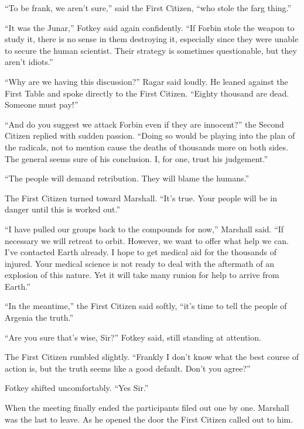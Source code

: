 ``To be frank, we aren't sure,'' said the First Citizen, ``who stole the farg thing.''

``It was the Junar,'' Fotkey said again confidently. ``If Forbin stole the weapon to study it,
there is no sense in them destroying it, especially since they were unable to secure the human
scientist. Their strategy is sometimes questionable, but they aren't idiots.''


``Why are we having this discussion?'' Ragar said loudly. He leaned against the First Table and
spoke directly to the First Citizen. ``Eighty thousand are dead. Someone must pay!''

``And do you suggest we attack Forbin even if they are innocent?'' the Second Citizen replied
with sudden passion. ``Doing so would be playing into the plan of the radicals, not to mention
cause the deaths of thousands more on both sides. The general seems sure of his conclusion. I,
for one, trust his judgement.''

``The people will demand retribution. They will blame the humans.''

The First Citizen turned toward Marshall. ``It's true. Your people will be in danger until this
is worked out.''

``I have pulled our groups back to the compounds for now,'' Marshall said. ``If necessary we
will retreat to orbit. However, we want to offer what help we can. I've contacted Earth already.
I hope to get medical aid for the thousands of injured. Your medical science is not ready to
deal with the aftermath of an explosion of this nature. Yet it will take many runion for help
to arrive from Earth.''

``In the meantime,'' the First Citizen said softly, ``it's time to tell the people of Argenia
the truth.''

``Are you sure that's wise, Sir?'' Fotkey said, still standing at attention.

The First Citizen rumbled slightly. ``Frankly I don't know what the best course of action is,
but the truth seems like a good default. Don't you agree?''

Fotkey shifted uncomfortably. ``Yes Sir.''

When the meeting finally ended the participants filed out one by one. Marshall was the last to
leave. As he opened the door the First Citizen called out to him.

